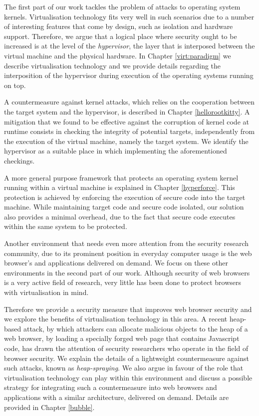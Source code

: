 The first part of our work tackles the problem of attacks to operating system kernels. Virtualisation technology fits very well in such scenarios due to a number of interesting features that come by design, such as isolation and hardware support. Therefore, we argue that a logical place where security ought to be increased is at the level of the \emph{hypervisor}, the layer that is interposed between the virtual machine and the physical hardware. In Chapter \ref{virt:paradigm} we describe virtualisation technology and we provide details regarding the interposition of the hypervisor during execution of the operating systems running on top.

A countermeasure against kernel attacks, which relies on the cooperation between the target system and the hypervisor, is described in Chapter \ref{hellorootkitty}. A mitigation that we found to be effective against the corruption of kernel code at runtime consists in checking the integrity of potential targets, independently from the execution of the virtual machine, namely the target system. We identify the hypervisor as a suitable place in which implementing the aforementioned checkings.
  
A more general purpose framework that protects an operating system kernel running within a virtual machine is explained in Chapter \ref{hyperforce}. This protection is achieved by enforcing the execution of secure code into the target machine. While maintaining target code and secure code isolated, our solution also provides a minimal overhead, due to the fact that secure code executes within the same system to be protected.


Another environment that needs even more attention from the security research community, due to its prominent position in everyday computer usage is the web browser's and applications delivered on demand. We focus on these other environments in the second part of our work. 
Although security of web browsers is a very active field of research, very little has been done to protect browsers with virtualisation in mind. 

Therefore we provide a security measure that improves web browser security and we explore the benefits of virtualisation technology in this area. A recent heap-based attack, by which attackers can allocate malicious objects to the heap of a web browser, by loading a specially forged web page that contains Javascript code, has drawn the attention of security researchers who operate in the field of browser security. We explain the details of a lightweight countermeasure against such attacks, known as \emph{heap-spraying}. We also argue in favour of the role that virtualisation technology can play within this environment and discuss a possible strategy for integrating such a countermeasure into web browsers and applications with a similar architecture, delivered on demand. Details are provided in Chapter \ref{bubble}.


